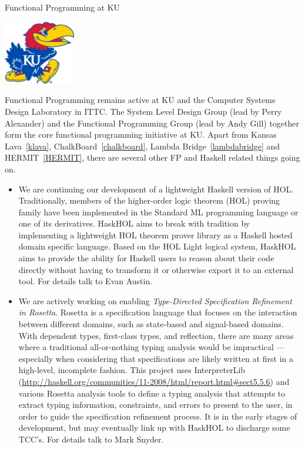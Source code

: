 \begin{hcarentry}[section]{Functional Programming at KU}
\makeheader

\begin{center}
\includegraphics[width=0.235\textwidth]{html/jh2.jpg}
\end{center}

Functional Programming remains active at KU and 
the Computer Systems Design Laboratory in ITTC.
The System Level Design Group (lead by Perry Alexander)
and the Functional Programming Group (lead by Andy Gill)
together form the core functional programming initiative at KU.
Apart from Kansas Lava~\cref{klava}, ChalkBoard~\cref{chalkboard}, 
Lambda Bridge~\cref{lambdabridge} and HERMIT~\cref{HERMIT},
there are several other
FP and Haskell related things going on.

\begin{itemize}
\item We are continuing our development of a lightweight Haskell version of HOL.
Traditionally, members of the higher-order logic theorem (HOL) proving family have
been implemented in the Standard ML programming language or one of its derivatives.
HaskHOL aims to break with tradition by implementing a lightweight HOL theorem prover
library as a Haskell hosted domain specific language. Based on the HOL Light logical
system, HaskHOL aims to provide the ability for Haskell users to reason about their
code directly without having to transform it or otherwise export it to an external
tool. For details talk to Evan Austin.

\item We are actively working on enabling {\em Type-Directed Specification Refinement in Rosetta\/}. Rosetta is a specification language that focuses on the interaction between different domains, such as state-based and signal-based domains.  With dependent types, first-class types, and reflection, there are many areas where a traditional all-or-nothing typing analysis would be impractical --- especially when considering that specifications are likely written at first in a high-level, incomplete fashion.  This project uses InterpreterLib (\url{http://haskell.org/communities/11-2008/html/report.html#sect5.5.6}) and various Rosetta analysis tools to define a typing analysis that attempts to extract typing information, constraints, and errors to present to the user, in order to guide the specification refinement process.  It is in the early stages of development, but may eventually link up with HaskHOL to discharge some TCC's. For details talk to Mark Snyder.


\end{itemize}
\end{hcarentry}
